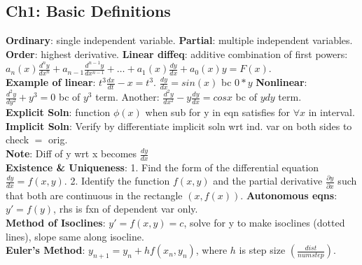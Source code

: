 \subsection*{Ch1: Basic Definitions}
\textbf{Ordinary}: single independent variable. 
\textbf{Partial}: multiple independent variables.
\textbf{Order}: highest derivative.
\textbf{Linear diffeq}: additive combination of first powers: $a_n(x)\frac{d^ny}{dx^n} + a_{n-1} \frac{d^{n-1}y}{dx^{n-1}} + \dots + a_1(x)\frac{dy}{dx} + a_0(x)y = F(x)$. \\
\textbf{Example of linear}: $t^3 \frac{dx}{dt} - x = t^3$. $\frac{dy}{dx} = sin(x)$ bc $0*y$ \textbf{Nonlinear}: $\frac{d^2y}{dy^2} + y^3 = 0$ bc of $y^3$ term. Another: $\frac{d^2y}{dx^2} - y\frac{dy}{dx} = cosx$ bc of $ydy$ term. \\
\textbf{Explicit Soln}: function $\phi(x)$ when sub for y in eqn satisfies for $\forall x$ in interval. 
\textbf{Implicit Soln}: Verify by differentiate implicit soln wrt ind. var on both sides to check $=$ orig. \\
\textbf{Note}: Diff of y wrt x becomes $\frac{dy}{dx}$ \\
\textbf{Existence \& Uniqueness}:
1. Find the form of the differential equation $\frac{dy}{dx} = f(x,y)$.
2. Identify the function $f(x,y)$ and the partial derivative $\frac{\partial y}{\partial x}$ such that both are continuous in the rectangle $(x,f(x))$.
\textbf{Autonomous eqns}: $y' = f(y)$, rhs is fxn of dependent var only. \\
\textbf{Method of Isoclines}: $y' = f(x,y) = c$, solve for y to make isoclines (dotted lines), slope same along isocline. \\
\textbf{Euler's Method}: $y_{n+1} = y_n + hf(x_n,y_n)$, where $h$ is step size $(\frac{dist}{num step})$. \\